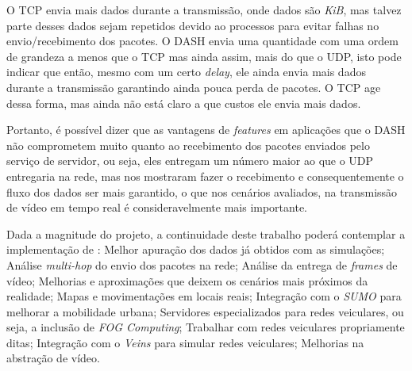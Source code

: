 \documentclass[12pt]{article}
\begin{document}
    O TCP envia mais dados durante a transmissão, onde dados são \textit{KiB}, mas talvez parte desses dados sejam repetidos devido ao processos para evitar falhas no envio/recebimento dos pacotes. O DASH envia uma quantidade com uma ordem de grandeza a menos que o TCP mas ainda assim, mais do que o UDP, isto pode indicar que então, mesmo com um certo \textit{delay}, ele ainda envia mais dados durante a transmissão garantindo ainda pouca perda de pacotes. O TCP age dessa forma, mas ainda não está claro a que custos ele envia mais dados.
    
	Portanto, é possível dizer que as vantagens de \textit{features} em aplicações que o DASH não comprometem muito quanto ao recebimento dos pacotes enviados pelo serviço de servidor, ou seja, eles entregam um número maior ao que o UDP entregaria na rede, mas nos mostraram fazer o recebimento e consequentemente o fluxo dos dados ser mais garantido, o que nos cenários avaliados, na transmissão de vídeo em tempo real é consideravelmente mais importante.

	Dada a magnitude do projeto, a continuidade deste trabalho poderá contemplar a implementação de : Melhor apuração dos dados já obtidos com as simulações; Análise \textit{multi-hop} do envio dos pacotes na rede; Análise da entrega de \textit{frames} de vídeo; Melhorias e aproximações que deixem os cenários mais próximos da realidade; Mapas e movimentações em locais reais; Integração com o \textit{SUMO} para melhorar a mobilidade urbana; Servidores especializados para redes veiculares, ou seja, a inclusão de \textit{FOG Computing}; Trabalhar com redes veiculares propriamente ditas; Integração com o \textit{Veins} para simular redes veiculares; Melhorias na abstração de vídeo.

		
%
%

\end{document}
